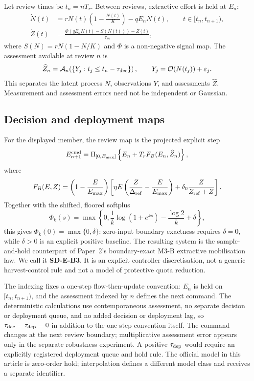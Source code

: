 \documentclass[11pt]{article}
\newcommand{\PiE}{\Pi_{[0,E_{\max}]}}
\begin{document}
Let review times be $t_n=nT_r$. Between reviews, extractive effort is held at $E_n$:
\begin{align}
\dot N(t)&=rN(t)\left(1-\frac{N(t)}{K}\right)-qE_nN(t),
\qquad t\in[t_n,t_{n+1}), \label{eq:sample-N}\\
\dot Z(t)&=\frac{\Phi(qE_nN(t)-S(N(t)))-Z(t)}{\tau_m}, \label{eq:sample-Z}
\end{align}
where $S(N)=rN(1-N/K)$ and $\Phi$ is a non-negative signal map. The assessment available at review $n$ is
\begin{equation}
\widehat Z_n=\mathcal A_n\!\left(\{Y_j:t_j\le t_n-\tau_{\rm dec}\}\right),
\qquad
Y_j=\mathcal O(N(t_j))+\varepsilon_j.
\label{eq:assessment}
\end{equation}
This separates the latent process $N$, observations $Y$, and assessments $\widehat Z$. Measurement and assessment errors need not be independent or Gaussian.

\subsection{Decision and deployment maps}

For the displayed member, the review map is the projected explicit step
\begin{equation}
E_{n+1}^{\rm cmd}
=\PiE\left\{E_n+T_rF_B(E_n,\widehat Z_n)\right\},
\label{eq:update}
\end{equation}
where
\begin{equation}
F_B(E,Z)=\left(1-\frac{E}{E_{\max}}\right)
\left[
\eta E\left(\frac{Z}{\Delta_{\rm ref}}-\frac{E}{E_{\max}}\right)
+\delta_0\frac{Z}{Z_{\rm ref}+Z}
\right].
\label{eq:FB}
\end{equation}
Together with the shifted, floored softplus
\[
\Phi_k(s)=\max\left\{0,\frac{1}{k}\log(1+e^{ks})-\frac{\log 2}{k}+\delta\right\},
\]
this gives $\Phi_k(0)=\max\{0,\delta\}$: zero-input boundary exactness requires $\delta=0$, while $\delta>0$ is an explicit positive baseline. The resulting system is the sample-and-hold counterpart of Paper~2's boundary-exact M3-B extractive mobilisation law. We call it \textbf{SD-E-B3}. It is an explicit controller discretisation, not a generic harvest-control rule and not a model of protective quota reduction.

The indexing fixes a one-step flow-then-update convention: $E_n$ is held on $[t_n,t_{n+1})$, and the assessment indexed by $n$ defines the next command. The deterministic calculations use contemporaneous assessment, no separate decision or deployment queue, and no added decision or deployment lag, so $\tau_{\rm dec}=\tau_{\rm dep}=0$ in addition to the one-step convention itself. The command changes at the next review boundary; multiplicative assessment error appears only in the separate robustness experiment. A positive $\tau_{\rm dep}$ would require an explicitly registered deployment queue and hold rule. The official model in this article is zero-order hold; interpolation defines a different model class and receives a separate identifier.
\end{document}
